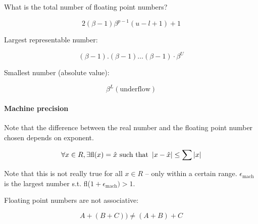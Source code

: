 What is the total number of floating point numbers?

\[
	2(\beta - 1) \beta^{p-1} (u-l+1) + 1
\]

Largest representable number:

\[
	(\beta - 1).(\beta - 1)\dots(\beta - 1) \cdot \beta^U
\]

Smallest number (absolute value):

\[
	\beta^L (\text{underflow})
\]

\paragraph{Machine precision} Note that the difference between the real number and the floating point number chosen depends on exponent.

\[
	\forall x \in R, \exists \text{fl}(x) = \hat{x} \text{ such that } \left|x-\hat{x}\right| \leq \sum \left|x\right|
\]

Note that this is not really true for all $x \in R$ -- only within a certain range. $\epsilon_{\text{mach}}$ is the largest number s.t. fl($1 + \epsilon_{\text{mach}}) > 1$.

Floating point numbers are not associative:

\[
	A+(B+C)) \not= (A+B)+C
\]